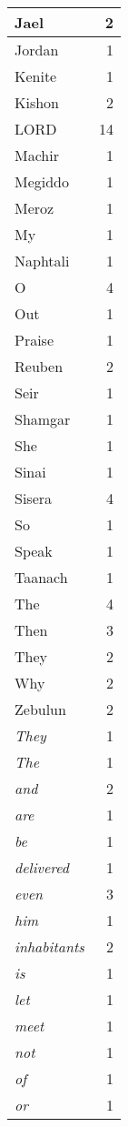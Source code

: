 \begin{center}
\begin{longtable}{l|r}
Jael & 2\\ \hline 
Jordan & 1\\ \hline 
Kenite & 1\\ \hline 
Kishon & 2\\ \hline 
LORD & 14\\ \hline 
Machir & 1\\ \hline 
Megiddo & 1\\ \hline 
Meroz & 1\\ \hline 
My & 1\\ \hline 
Naphtali & 1\\ \hline 
O & 4\\ \hline 
Out & 1\\ \hline 
Praise & 1\\ \hline 
Reuben & 2\\ \hline 
Seir & 1\\ \hline 
Shamgar & 1\\ \hline 
She & 1\\ \hline 
Sinai & 1\\ \hline 
Sisera & 4\\ \hline 
So & 1\\ \hline 
Speak & 1\\ \hline 
Taanach & 1\\ \hline 
The & 4\\ \hline 
Then & 3\\ \hline 
They & 2\\ \hline 
Why & 2\\ \hline 
Zebulun & 2\\ \hline 
\emph{They} & 1\\ \hline 
\emph{The} & 1\\ \hline 
\emph{and} & 2\\ \hline 
\emph{are} & 1\\ \hline 
\emph{be} & 1\\ \hline 
\emph{delivered} & 1\\ \hline 
\emph{even} & 3\\ \hline 
\emph{him} & 1\\ \hline 
\emph{inhabitants} & 2\\ \hline 
\emph{is} & 1\\ \hline 
\emph{let} & 1\\ \hline 
\emph{meet} & 1\\ \hline 
\emph{not} & 1\\ \hline 
\emph{of} & 1\\ \hline 
\emph{or} & 1\\ \hline 

\end{longtable}
\end{center}
